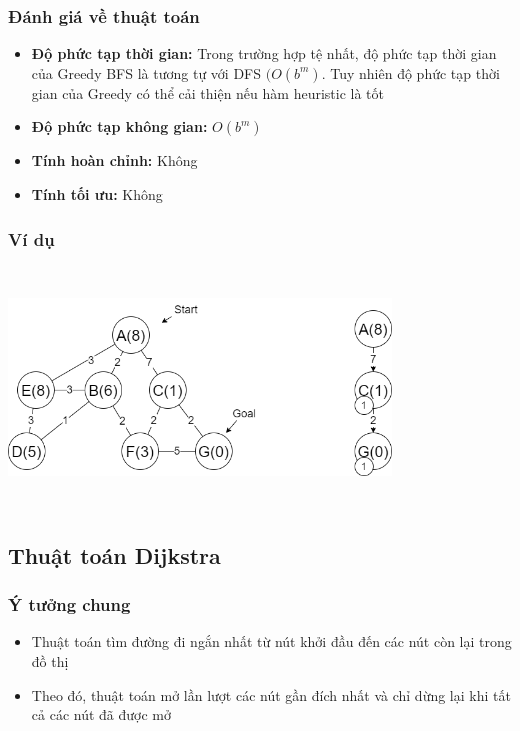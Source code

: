 \documentclass{article}
\begin{document}
\subsubsection{Đánh giá về thuật toán}
\begin{itemize}
    \item \textbf{Độ phức tạp thời gian:} Trong trường hợp tệ nhất, độ phức tạp thời gian của Greedy BFS là tương tự với DFS $(O(b^m)$. Tuy nhiên độ phức tạp thời gian của Greedy có thể cải thiện nếu hàm heuristic là tốt
    \item \textbf{Độ phức tạp không gian:} $O(b^m)$ 
    \item \textbf{Tính hoàn chỉnh:} Không
    \item \textbf{Tính tối ưu:} Không
\end{itemize}

\subsubsection{Ví dụ}
    \centerline{\includegraphics[width=4in, height=2.5in]{image/greedy.png}}
    \vspace{2\baselineskip}
\subsection{Thuật toán Dijkstra}
\subsubsection{Ý tưởng chung}
\begin{itemize}
    \item Thuật toán tìm đường đi ngắn nhất từ nút khởi đầu đến các nút còn lại trong đồ thị
    \item Theo đó, thuật toán mở lần lượt các nút gần đích nhất và chỉ dừng lại khi tất cả các nút đã được mở
\end{itemize}
\end{document}
